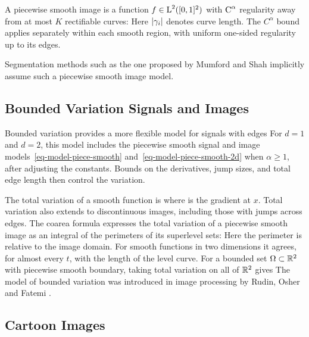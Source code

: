 A piecewise smooth image is a function $f \in \text{\upshape L}^2([0,1]^2)$ with $\text{C}^\alpha$ regularity away from at most $K$ rectifiable curves:
Here $|\gamma_i|$ denotes curve length. The $C^\alpha$ bound applies separately within each smooth region, with uniform one-sided regularity up to its edges.

Segmentation methods such as the one proposed by Mumford and Shah \cite{mumford-shah} implicitly assume such a piecewise smooth image model.

\subsection{Bounded Variation Signals and Images}
\label{subsec-bv-model}

Bounded variation provides a more flexible model for signals with edges
For $d=1$ and $d=2$, this model includes the piecewise smooth signal and image models~\eqref{eq-model-piece-smooth} and~\eqref{eq-model-piece-smooth-2d} when $\alpha\geq1$, after adjusting the constants. Bounds on the derivatives, jump sizes, and total edge length then control the variation.

The total variation of a smooth function is 
where 
is the gradient at $x$. Total variation also extends to discontinuous images, including those with jumps across edges. The coarea formula expresses the total variation of a piecewise smooth image as an integral of the perimeters of its superlevel sets:
Here the perimeter is relative to the image domain. For smooth functions in two dimensions it agrees, for almost every $t$, with the length of the level curve. For a bounded set $\Omega\subset\mathbb{R}^2$ with piecewise smooth boundary, taking total variation on all of $\mathbb{R}^2$ gives
The model of bounded variation was introduced in image processing by Rudin, Osher and Fatemi \cite{rudin-tv}.

\subsection{Cartoon Images}
\label{subsec-cartoon-images}


